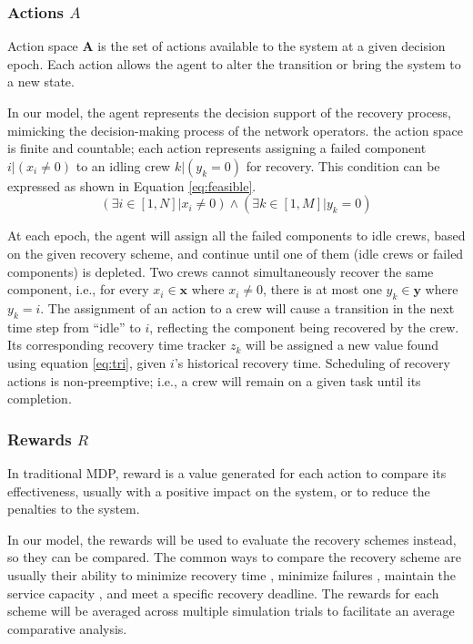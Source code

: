 \documentclass[conference]{IEEEtran}
\begin{document}
\subsubsection{Actions \texorpdfstring{$A$}{A} }
Action space $\mathbf{A}$ is the set of actions available to the system at a given decision epoch. Each action allows the agent to alter the transition or bring the system to a new state. 

In our model, the agent represents the decision support of the recovery process, mimicking the decision-making process of the network operators. the action space is finite and countable; each action represents assigning a failed component  $i | (x_i \neq 0)$  to an idling crew $k | (y_k = 0)$ for recovery. This condition can be expressed as shown in Equation \ref{eq:feasible}. 
\begin{equation}
(\exists i \in [1,N] | x_i \neq 0) \land (\exists k \in [1,M] | y_k = 0)
\label{eq:feasible}
\end{equation}

At each epoch, the agent will assign all the failed components to idle crews, based on the given recovery scheme, and continue until one of them (idle crews or failed components) is depleted. Two crews cannot simultaneously recover the same component, i.e., for every $x_i \in \mathbf{x}$ where $x_i \neq 0$, there is at most one $y_k \in \mathbf{y}$ where $y_k = i$. The assignment of an action to a crew will cause a transition in the next time step from ``idle'' to $i$, reflecting the component being recovered by the crew. Its corresponding recovery time tracker $z_k$ will be assigned a new value found using equation \ref{eq:tri}, given $i$'s historical recovery time. Scheduling of recovery actions is non-preemptive; i.e., a crew will remain on a given task until its completion. 

\subsubsection{Rewards \texorpdfstring{$R$}{R}}
\label{sec:rewards}
In traditional MDP, reward is a value generated for each action to compare its effectiveness, usually with a positive impact on the system, or to reduce the penalties to the system. 

In our model, the rewards will be used to evaluate the recovery schemes instead, so they can be compared. The common ways to compare the recovery scheme are usually their ability to minimize recovery time \cite{biswas_repair_2025}, minimize failures \cite{wang_q-learning-based_2025}, maintain the service capacity \cite{redacted3,yan_dynamic_2021,sarkale_solving_2018}, and meet a specific recovery deadline.  The rewards for each scheme will be averaged across multiple simulation trials to facilitate an average comparative analysis.
\end{document}
